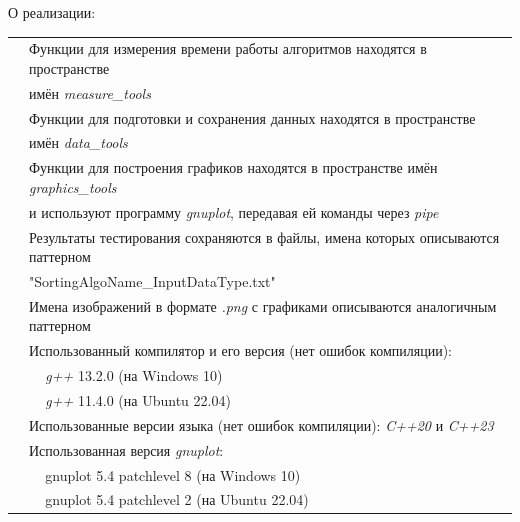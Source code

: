 \documentclass[11pt,a4paper]{article}
\begin{document}
\pagebreak

О реализации:

\begin{tabular}{rl}
    &  Функции для измерения времени работы
    алгоритмов находятся в пространстве \\
    & имён \textit{measure\_tools} \\
    & Функции для подготовки и сохранения
    данных находятся в пространстве \\
    & имён \textit{data\_tools} \\
    & Функции для построения графиков находятся 
    в пространстве имён \textit{graphics\_tools} \\
    & и используют программу \textit{gnuplot},
    передавая ей команды через \textit{pipe} \\
    & Результаты тестирования сохраняются в
    файлы, имена которых описываются паттерном \\
    & "SortingAlgoName\_InputDataType.txt" \\
    & Имена изображений в формате \textit{.png} 
    с графиками описываются аналогичным паттерном \\
    & Использованный компилятор и его версия (нет ошибок компиляции): \\ 
    & \,\,\,\,\, \textit{g++} 13.2.0 (на Windows 10) \\
    & \,\,\,\,\, \textit{g++}  11.4.0 (на Ubuntu 22.04) \\
    & Использованные версии языка (нет ошибок компиляции): 
    \textit{C++20} и \textit{C++23} \\
    & Использованная версия \textit{gnuplot}: \\
    & \,\,\,\,\, gnuplot 5.4 patchlevel 8 (на Windows 10) \\
    & \,\,\,\,\, gnuplot 5.4 patchlevel 2 (на Ubuntu 22.04) \\
\end{tabular}
\end{document}

